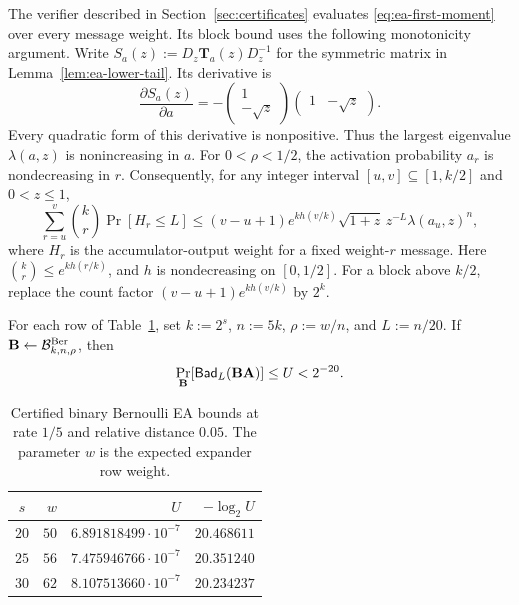 The verifier described in Section~\ref{sec:certificates} evaluates
\eqref{eq:ea-first-moment} over every message weight.
Its block bound uses the following monotonicity argument.
Write $S_a(z):=D_z\mathbf T_a(z)D_z^{-1}$ for the symmetric matrix in
Lemma~\ref{lem:ea-lower-tail}.  Its derivative is
\[
 \frac{\partial S_a(z)}{\partial a}
 =-\begin{pmatrix}1\\-\sqrt z\end{pmatrix}
   \begin{pmatrix}1&-\sqrt z\end{pmatrix}.
\]
Every quadratic form of this derivative is nonpositive.  Thus the largest
eigenvalue $\lambda(a,z)$ is nonincreasing in $a$.
For $0<\rho<1/2$, the activation probability $a_r$ is nondecreasing in $r$.
Consequently, for any integer interval $[u,v]\subseteq[1,k/2]$ and
$0<z\leq1$,
\begin{equation}
 \sum_{r=u}^{v}\binom{k}{r}\Pr[H_r\leq L]
 \leq(v-u+1)e^{k h(v/k)}\sqrt{1+z}\,z^{-L}\lambda(a_u,z)^n,
 \label{eq:ea-finite-block}
\end{equation}
where $H_r$ is the accumulator-output weight for a fixed weight-$r$ message.
Here $\binom{k}{r}\leq e^{k h(r/k)}$, and $h$ is nondecreasing on $[0,1/2]$.
For a block above $k/2$, replace the count factor
$(v-u+1)e^{k h(v/k)}$ by $2^k$.

\begin{theorem}
\label{thm:ea-finite}
For each row of Table~\ref{tab:ea-finite}, set $k:=2^s$, $n:=5k$,
$\rho:=w/n$, and $L:=n/20$.  If
$\mathbf B\gets\mathcal B^{\mathrm{Ber}}_{k,n,\rho}$, then
\begin{equation}
 \Pr_{\mathbf B}[\mathsf{Bad}_L(\mathbf B\mathbf A)]\leq U<2^{-20}.
\end{equation}
\end{theorem}

\begin{table}[t]
\centering
\caption{Certified binary Bernoulli EA bounds at rate $1/5$ and relative
distance $0.05$.  The parameter $w$ is the expected expander row weight.}
\label{tab:ea-finite}
\begin{tabular}{@{}crrr@{}}
\toprule
$s$ & $w$ & $U$ & $-\log_2U$ \\
\midrule
$20$ & $50$ & $6.891818499\cdot10^{-7}$ & $20.468611$ \\
$25$ & $56$ & $7.475946766\cdot10^{-7}$ & $20.351240$ \\
$30$ & $62$ & $8.107513660\cdot10^{-7}$ & $20.234237$ \\
\bottomrule
\end{tabular}
\end{table}

